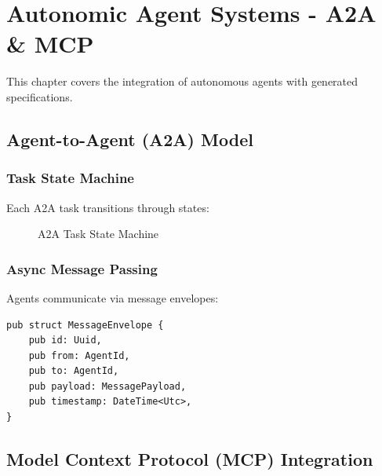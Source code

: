 \chapter{Autonomic Agent Systems - A2A \& MCP}

This chapter covers the integration of autonomous agents with generated specifications.

\section{Agent-to-Agent (A2A) Model}

\subsection{Task State Machine}

Each A2A task transitions through states:

\begin{figure}[h]
\centering
{}
\caption{A2A Task State Machine}
\end{figure}

\subsection{Async Message Passing}

Agents communicate via message envelopes:

\begin{verbatim}
pub struct MessageEnvelope {
    pub id: Uuid,
    pub from: AgentId,
    pub to: AgentId,
    pub payload: MessagePayload,
    pub timestamp: DateTime<Utc>,
}
\end{verbatim}

\section{Model Context Protocol (MCP) Integration}

